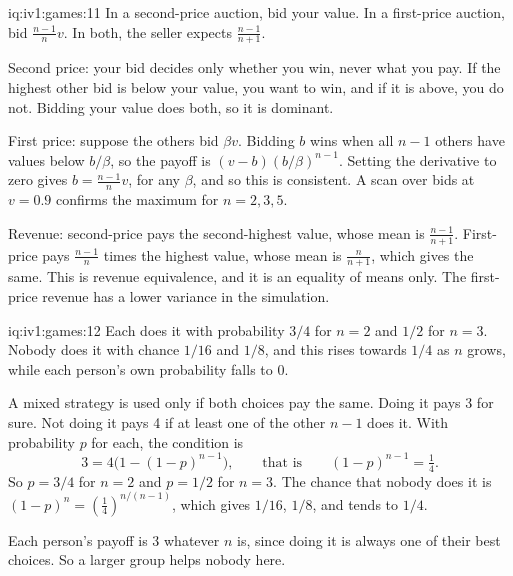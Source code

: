 \begin{solution}{iq:iv1:games:11}
In a second-price auction, bid your value. In a first-price auction, bid $\frac{n - 1}{n}v$. In both, the seller expects $\frac{n - 1}{n + 1}$.

Second price: your bid decides only whether you win, never what you pay. If the highest other bid is below your value, you want to win, and if it is above, you do not. Bidding your value does both, so it is dominant.

First price: suppose the others bid $\beta v$. Bidding $b$ wins when all $n - 1$ others have values below $b/\beta$, so the payoff is $(v - b)(b/\beta)^{n - 1}$. Setting the derivative to zero gives $b = \frac{n - 1}{n}v$, for any $\beta$, and so this is consistent. A scan over bids at $v = 0.9$ confirms the maximum for $n = 2, 3, 5$.

Revenue: second-price pays the second-highest value, whose mean is $\frac{n - 1}{n + 1}$. First-price pays $\frac{n - 1}{n}$ times the highest value, whose mean is $\frac{n}{n + 1}$, which gives the same. This is revenue equivalence, and it is an equality of means only. The first-price revenue has a lower variance in the simulation.

\end{solution}

\begin{solution}{iq:iv1:games:12}
Each does it with probability $3/4$ for $n = 2$ and $1/2$ for $n = 3$. Nobody does it with chance $1/16$ and $1/8$, and this rises towards $1/4$ as $n$ grows, while each person's own probability falls to 0.

A mixed strategy is used only if both choices pay the same. Doing it pays 3 for sure. Not doing it pays 4 if at least one of the other $n - 1$ does it. With probability $p$ for each, the condition is
\[
3 = 4\bigl(1 - (1 - p)^{n - 1}\bigr), \qquad\text{that is}\qquad (1 - p)^{n - 1} = \tfrac14.
\]
So $p = 3/4$ for $n = 2$ and $p = 1/2$ for $n = 3$. The chance that nobody does it is $(1 - p)^n = (\tfrac14)^{n/(n - 1)}$, which gives $1/16$, $1/8$, and tends to $1/4$.

Each person's payoff is 3 whatever $n$ is, since doing it is always one of their best choices. So a larger group helps nobody here.

\end{solution}


